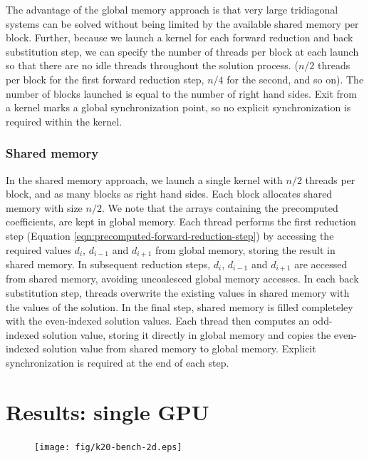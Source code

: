 \documentclass{elsarticle}
\begin{document}
The advantage of the global memory approach is that
very large tridiagonal systems can be solved without
being limited by the available shared memory per block.
Further,
because we launch a kernel for each
forward reduction and back substitution step,
we can specify the number of threads per block at each launch so that
there are no idle threads throughout the solution process.
($n/2$ threads per block for the first forward reduction step,
$n/4$ for the second, and so on).
The number of blocks launched is equal to the number of right
hand sides.
Exit from a kernel marks a global synchronization point,
so no explicit synchronization is required within the kernel.

\subsubsection*{Shared memory}

In the shared memory approach,
we launch a single kernel with $n/2$ threads per block,
and as many blocks as right hand sides.
Each block allocates shared memory with size $n/2$.
We note that the arrays containing the precomputed coefficients,
are kept in global memory.
Each thread performs the first reduction step
(Equation \ref{eqn:precomputed-forward-reduction-step})
by accessing the required values
$d_i$, $d_{i-1}$ and $d_{i+1}$ from global memory,
storing the result in shared memory.
In subsequent reduction steps,
$d_i$, $d_{i-1}$ and $d_{i+1}$
are accessed from shared memory,
avoiding uncoalesced global memory accesses.
In each back substitution step,
threads overwrite the existing values in shared memory
with the values of the solution.
In the final step,
shared memory is filled completeley
with the even-indexed solution values.
Each thread then computes an odd-indexed solution value,
storing it directly in global memory
and copies the even-indexed solution value
from shared memory to global memory.
Explicit synchronization is required at the end of each step.


\pagebreak
\section{Results: single GPU} \label{sec:results-single-gpu}

\begin{figure}[h!]
\begin{center}
\texttt{[image: fig/k20-bench-2d.eps]}
\end{center}
\label{fig:k20-bench-2d}
\end{figure}
\end{document}
